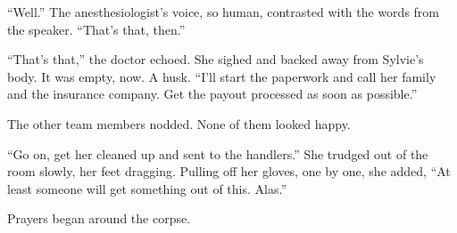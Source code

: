 ``Well.'' The anesthesiologist's voice, so human, contrasted with the words from the speaker. ``That's that, then.''

``That's that,'' the doctor echoed. She sighed and backed away from Sylvie's body. It was empty, now. A husk. ``I'll start the paperwork and call her family and the insurance company. Get the payout processed as soon as possible.''

The other team members nodded. None of them looked happy.

``Go on, get her cleaned up and sent to the handlers.'' She trudged out of the room slowly, her feet dragging. Pulling off her gloves, one by one, she added, ``At least someone will get something out of this. Alas.''

Prayers began around the corpse.
